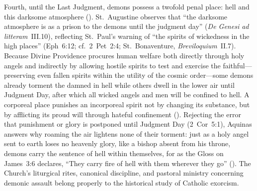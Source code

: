 Fourth, until the Last Judgment, demons possess a twofold penal place: hell and this darksome atmosphere (). St.~Augustine observes that ``the darksome atmosphere is as a prison to the demons until the judgment day'' (\emph{De Genesi ad litteram}~III.10), reflecting St.~Paul's warning of ``the spirits of wickedness in the high places'' (Eph~6:12; cf.~2~Pet~2:4; St.~Bonaventure, \emph{Breviloquium}~II.7). Because Divine Providence procures human welfare both directly through holy angels and indirectly by allowing hostile spirits to test and exercise the faithful---preserving even fallen spirits within the utility of the cosmic order---some demons already torment the damned in hell while others dwell in the lower air until Judgment Day, after which all wicked angels and men will be confined to hell. A corporeal place punishes an incorporeal spirit not by changing its substance, but by afflicting its proud will through hateful confinement (). Rejecting the error that punishment or glory is postponed until Judgment Day (2~Cor~5:1), Aquinas answers why roaming the air lightens none of their torment: just as a holy angel sent to earth loses no heavenly glory, like a bishop absent from his throne, demons carry the sentence of hell within themselves, for as the Gloss on James~3:6 declares, ``They carry fire of hell with them wherever they go'' (). The Church's liturgical rites, canonical discipline, and pastoral ministry concerning demonic assault belong properly to the historical study of Catholic exorcism.

